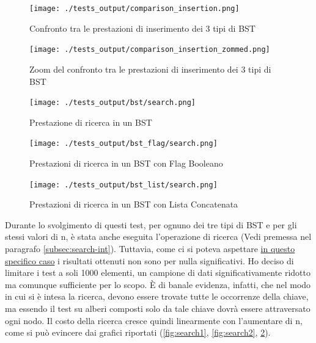 \documentclass{article}
\begin{document}
\begin{figure}[htbp]
 \begin{minipage}{0.5\textwidth}
    \centering
    \texttt{[image: ./tests\_output/comparison\_insertion.png]}
    \caption{Confronto tra le prestazioni di inserimento dei 3 tipi di BST}
    \label{fig:comparison_insertion}
  \end{minipage}
      \hspace{0.05\textwidth}
  \begin{minipage}{0.5\textwidth}
    \centering
    \texttt{[image: ./tests\_output/comparison\_insertion\_zommed.png]}
    \caption{Zoom del confronto tra le prestazioni di inserimento dei 3 tipi di BST}
    \label{fig:comparison_insertion_zommed}
  \end{minipage}%
\end{figure}


\newpage

\begin{figure}[htbp]
  \begin{minipage}{0.32\textwidth}
    \centering
    \texttt{[image: ./tests\_output/bst/search.png]}
    \caption{Prestazione di ricerca in un BST}
    \label{fig:search1}
  \end{minipage}
  \hfill
  \begin{minipage}{0.32\textwidth}
    \centering
    \texttt{[image: ./tests\_output/bst\_flag/search.png]}
    \caption{Prestazioni di ricerca in un BST con Flag Booleano}
    \label{fig:search2}
  \end{minipage}
  \hfill
  \begin{minipage}{0.32\textwidth}
    \centering
    \texttt{[image: ./tests\_output/bst\_list/search.png]}
    \caption{Prestazioni di ricerca in un BST con Lista Concatenata}
    \label{fig:search3}
  \end{minipage}
\end{figure}

Durante lo svolgimento di questi test, per ognuno dei tre tipi di BST e per gli stessi valori di n, è stata anche eseguita l'operazione di ricerca (Vedi premessa nel paragrafo \ref{subsec:search-int}).
Tuttavia, come ci si poteva aspettare \underline{in questo specifico caso} i risultati ottenuti non sono per nulla significativi.
Ho deciso di limitare i test a soli 1000 elementi, un campione di dati significativamente ridotto ma comunque sufficiente per lo scopo. È di banale evidenza, infatti, che nel modo in cui si è intesa la ricerca, devono essere trovate tutte le occorrenze  della chiave, ma essendo il test su alberi composti solo da tale chiave dovrà essere attraversato ogni nodo. Il costo della ricerca cresce quindi linearmente con l'aumentare di n, come si può evincere dai grafici riportati (\cref{fig:search1}, \cref{fig:search2}, \cref{fig:search3}).
\end{document}
